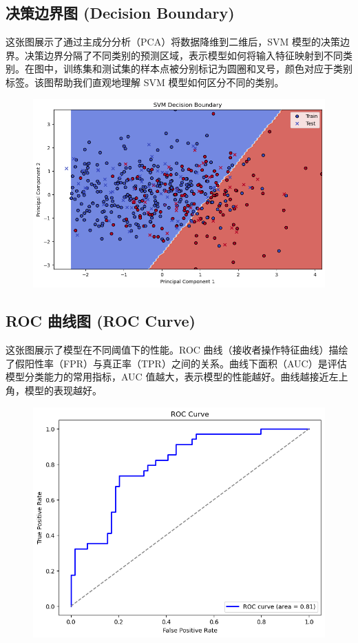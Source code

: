 \documentclass[UTF8]{article}
\begin{document}
	\subsection{决策边界图 (Decision Boundary)}
	这张图展示了通过主成分分析（PCA）将数据降维到二维后，SVM 模型的决策边界。决策边界分隔了不同类别的预测区域，表示模型如何将输入特征映射到不同类别。在图中，训练集和测试集的样本点被分别标记为圆圈和叉号，颜色对应于类别标签。该图帮助我们直观地理解 SVM 模型如何区分不同的类别。
	\begin{figure}[h]
		\centering\includegraphics[width=0.5\linewidth]{3.png}
	\end{figure}
	\subsection{ROC 曲线图 (ROC Curve)}
	这张图展示了模型在不同阈值下的性能。ROC 曲线（接收者操作特征曲线）描绘了假阳性率（FPR）与真正率（TPR）之间的关系。曲线下面积（AUC）是评估模型分类能力的常用指标，AUC 值越大，表示模型的性能越好。曲线越接近左上角，模型的表现越好。
	\begin{figure}[h]
		\centering\includegraphics[width=0.5\linewidth]{4.png}
	\end{figure}
\end{document}
